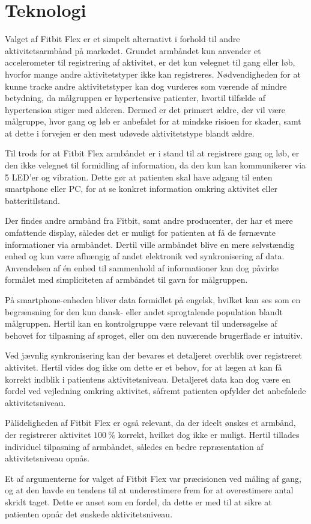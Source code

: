 \section{Teknologi} \label{sec:dis_teknologi}
Valget af Fitbit Flex er et simpelt alternativt i forhold til andre aktivitetsarmbånd på markedet. 
Grundet armbåndet kun anvender et accelerometer til registrering af aktivitet, er det kun velegnet til gang eller løb, hvorfor mange andre aktivitetstyper ikke kan registreres. 
Nødvendigheden for at kunne tracke andre aktivitetstyper kan dog vurderes som værende af mindre betydning, da målgruppen er hypertensive patienter, hvortil tilfælde af hypertension stiger med alderen. 
Dermed er det primært ældre, der vil være målgruppe, hvor gang og løb er anbefalet for at mindske risioen for skader, samt at dette i forvejen er den mest udøvede aktivitetstype blandt ældre. 

Til trods for at Fitbit Flex armbåndet er i stand til at registrere gang og løb, er den ikke velegnet til formidling af information, da den kun kan kommunikerer via 5 LED’er og vibration. 
Dette gør at patienten skal have adgang til enten smartphone eller PC, for at se konkret information omkring aktivitet eller batteritilstand. 

Der findes andre armbånd fra Fitbit, samt andre producenter, der har et mere omfattende display, således det er muligt for patienten at få de førnævnte informationer via armbåndet. 
Dertil ville armbåndet blive en mere selvstændig enhed og kun være afhængig af andet elektronik ved synkronisering af data. Anvendelsen af én enhed til sammenhold af informationer kan dog påvirke formålet med simpliciteten af armbåndet til gavn for målgruppen. 

På smartphone-enheden bliver data formidlet på engelsk, hvilket kan ses som en begrænsning for den kun dansk- eller andet sprogtalende population blandt målgruppen. Hertil kan en kontrolgruppe være relevant til undersøgelse af behovet for tilpasning af sproget, eller om den nuværende brugerflade er intuitiv. 

Ved jævnlig synkronisering kan der bevares et detaljeret overblik over registreret aktivitet. 
Hertil vides dog ikke om dette er et behov, for at lægen at kan få korrekt indblik i patientens aktivitetsniveau. Detaljeret data kan dog være en fordel ved vejledning omkring aktivitet, såfremt patienten opfylder det anbefalede aktivitetsniveau. 

Pålideligheden af Fitbit Flex er også relevant, da der ideelt ønskes et armbånd, der registrerer aktivitet $100~\%$ korrekt, hvilket dog ikke er muligt. Hertil tillades individuel tilpasning af armbåndet, således en bedre repræsentation af aktivitetsniveau opnås. 

Et af argumenterne for valget af Fitbit Flex var præcisionen ved måling af gang, og at den havde en tendens til at underestimere frem for at overestimere antal skridt taget. Dette er anset som en fordel, da dette er med til at sikre at patienten opnår det ønskede aktivitetsniveau.